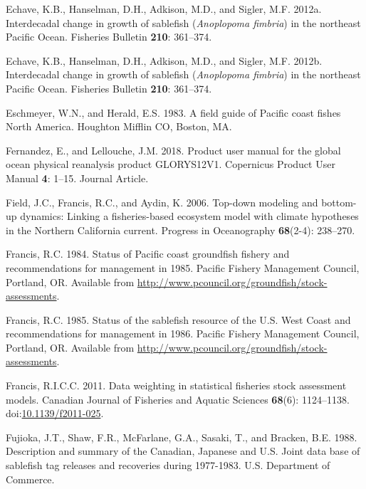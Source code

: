 \documentclass[
  english,
]{article}
\newlength{\cslhangindent}
\newenvironment{CSLReferences}[2] %
 {\begin{list}{}{%
  \setlength{\itemindent}{0pt}
  \setlength{\leftmargin}{0pt}
  \setlength{\parsep}{0pt}
  \ifodd #1
   \setlength{\leftmargin}{\cslhangindent}
   \setlength{\itemindent}{-1\cslhangindent}
  \fi
  \setlength{\itemsep}{#2\baselineskip}}}
 {\end{list}}
\begin{document}
\begin{CSLReferences}{1}{0}
Echave, K.B., Hanselman, D.H., Adkison, M.D., and Sigler, M.F. 2012a.
Interdecadal change in growth of sablefish (\emph{{A}noplopoma fimbria})
in the northeast {P}acific {O}cean. Fisheries Bulletin \textbf{210}:
361--374.

Echave, K.B., Hanselman, D.H., Adkison, M.D., and Sigler, M.F. 2012b.
Interdecadal change in growth of sablefish (\emph{{A}noplopoma fimbria})
in the northeast {P}acific {O}cean. Fisheries Bulletin \textbf{210}:
361--374.

Eschmeyer, W.N., and Herald, E.S. 1983. A field guide of {Pacific} coast
fishes {North} {America}. Houghton Mifflin CO, Boston, MA.

Fernandez, E., and Lellouche, J.M. 2018. Product user manual for the
global ocean physical reanalysis product GLORYS12V1. Copernicus Product
User Manual \textbf{4}: 1--15. Journal Article.

Field, J.C., Francis, R.C., and Aydin, K. 2006. Top-down modeling and
bottom-up dynamics: Linking a fisheries-based ecosystem model with
climate hypotheses in the {N}orthern {C}alifornia current. Progress in
Oceanography \textbf{68}(2-4): 238--270.

Francis, R.C. 1984. Status of {P}acific coast groundfish fishery and
recommendations for management in 1985. Pacific Fishery Management
Council, Portland, OR. Available from
\url{http://www.pcouncil.org/groundfish/stock-assessments}.

Francis, R.C. 1985. Status of the sablefish resource of the {U}.{S}.
{W}est {C}oast and recommendations for management in 1986. Pacific
Fishery Management Council, Portland, OR. Available from
\url{http://www.pcouncil.org/groundfish/stock-assessments}.

Francis, R.I.C.C. 2011. Data weighting in statistical fisheries stock
assessment models. Canadian Journal of Fisheries and Aquatic Sciences
\textbf{68}(6): 1124--1138.
doi:\href{https://doi.org/10.1139/f2011-025}{10.1139/f2011-025}.

Fujioka, J.T., Shaw, F.R., McFarlane, G.A., Sasaki, T., and Bracken,
B.E. 1988. Description and summary of the {C}anadian, {J}apanese and
{U}.{S}. Joint data base of sablefish tag releases and recoveries during
1977-1983. {U}.{S}. Department of Commerce.


\end{CSLReferences}
\end{document}
